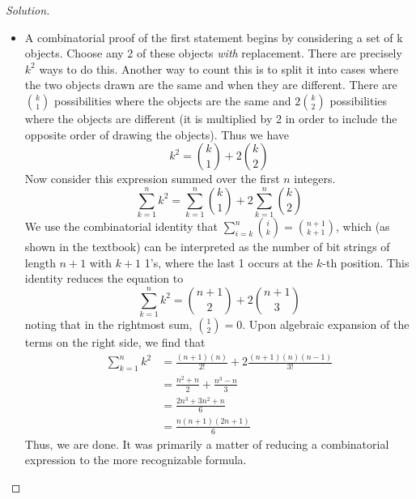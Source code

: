 \documentclass[12pt]{article}
\theoremstyle{definition}
\newenvironment{solution}{
  \begin{proof}[Solution]
    \vspace{-8px}
    \setlength{\parskip}{4px}
    \setlength{\parindent}{0px}
}{
\end{proof}
}
\begin{document}
\begin{solution}
\begin{enumerate}[label={(\alph*)}]
\begin{itemize}
        \item A combinatorial proof of the first statement begins by considering a set of k objects. Choose any 2 of these objects \textit{with} replacement. There are precisely \(k^2\) ways to do this. Another way to count this is to split it into cases where the two objects drawn are the same and when they are different. There are \({k \choose 1}\) possibilities where the objects are the same and \(2 {k \choose 2}\) possibilities where the objects are different (it is multiplied by 2 in order to include the opposite order of drawing the objects). Thus we have
        \[ k^2 = {k \choose 1} + 2 {k \choose 2} \]
        Now consider this expression summed over the first \(n\) integers.
        \[ \sum_{k=1}^{n} k^2 = \sum_{k=1}^{n} {k \choose 1} + 2 \sum_{k=1}^{n} {k \choose 2} \]
        We use the combinatorial identity that \(\sum_{i=k}^{n} {i \choose k} = {n+1 \choose k+1}\), which (as shown in the textbook) can be interpreted as the number of bit strings of length \(n+1\) with \(k+1\) 1's, where the last 1 occurs at the \(k\)-th position. This identity reduces the equation to
        \[ \sum_{k=1}^{n} k^2 = {n+1 \choose 2} + 2 {n+1 \choose 3} \]
        noting that in the rightmost sum, \({1 \choose 2} = 0\). Upon algebraic expansion of the terms on the right side, we find that
        \[
        \begin{split}
          \sum_{k=1}^{n} k^2 & = \frac{(n+1)(n)}{2!} + 2 \frac{(n+1)(n)(n-1)}{3!} \\
          & = \frac{n^2 + n}{2} + \frac{n^3 - n}{3} \\
          & = \frac{2n^3 + 3n^2 + n}{6} \\
          & = \frac{n(n+1)(2n+1)}{6}
        \end{split}
        \]
        Thus, we are done. It was primarily a matter of reducing a combinatorial expression to the more recognizable formula.


\end{itemize}
\end{enumerate}
\end{solution}
\end{document}
